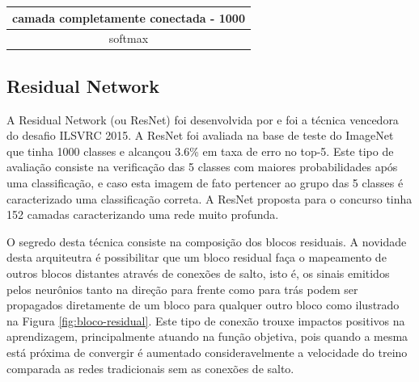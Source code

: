 \begin{table}[]
\begin{tabular}{|c|c|c|c|c|c|}
\multicolumn{6}{|c|}{camada completamente conectada - 1000}                                                                                                                                                                                                                                                                                                                                                                                   \\ \hline
\multicolumn{6}{|c|}{softmax}                                                                                                                                                                                                                                                                                                                                                                                                                 \\ \hline
\end{tabular}
\end{table}

\subsection{Residual Network}
A Residual Network (ou ResNet) foi desenvolvida por \cite{he2016deep} e foi a técnica vencedora do desafio ILSVRC 2015. A ResNet foi avaliada na base de teste do ImageNet que tinha 1000 classes e alcançou 3.6\% em taxa de erro no top-5. Este tipo de avaliação consiste na verificação das 5 classes com maiores probabilidades após uma classificação, e caso esta imagem de fato pertencer ao grupo das 5 classes é caracterizado uma classificação correta. A ResNet proposta para o concurso tinha 152 camadas caracterizando uma rede muito profunda. 

O segredo desta técnica consiste na composição dos blocos residuais. A novidade desta arquiteutra é possibilitar que um bloco residual faça o mapeamento de outros blocos distantes através de conexões de salto, isto é, os sinais emitidos pelos neurônios tanto na direção para frente como para trás podem ser propagados diretamente de um bloco para qualquer outro bloco como ilustrado na Figura \ref{fig:bloco-residual}. Este tipo de conexão trouxe impactos positivos na aprendizagem, principalmente atuando na função objetiva, pois quando a mesma está próxima de convergir é aumentado consideravelmente a velocidade do treino comparada as redes tradicionais sem as conexões de salto.   

